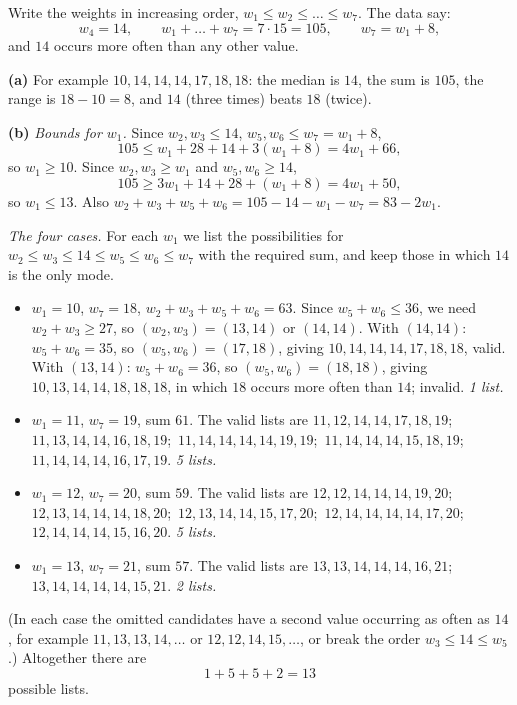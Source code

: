 Write the weights in increasing order, $w_1\le w_2\le\dots\le w_7$. The data say:
\[
w_4=14,\qquad w_1+\dots+w_7=7\cdot15=105,\qquad w_7=w_1+8,
\]
and $14$ occurs more often than any other value.

\textbf{(a)} For example $10,14,14,14,17,18,18$: the median is $14$, the sum is $105$, the range is $18-10=8$, and $14$ (three times) beats $18$ (twice).

\textbf{(b)} \emph{Bounds for $w_1$.} Since $w_2,w_3\le14$, $w_5,w_6\le w_7=w_1+8$,
\[
105\le w_1+28+14+3(w_1+8)=4w_1+66,
\]
so $w_1\ge10$. Since $w_2,w_3\ge w_1$ and $w_5,w_6\ge14$,
\[
105\ge 3w_1+14+28+(w_1+8)=4w_1+50,
\]
so $w_1\le13$. Also $w_2+w_3+w_5+w_6=105-14-w_1-w_7=83-2w_1$.

\emph{The four cases.} For each $w_1$ we list the possibilities for $w_2\le w_3\le14\le w_5\le w_6\le w_7$ with the required sum, and keep those in which $14$ is the only mode.
\begin{itemize}
\item $w_1=10$, $w_7=18$, $w_2+w_3+w_5+w_6=63$. Since $w_5+w_6\le36$, we need $w_2+w_3\ge27$, so $(w_2,w_3)=(13,14)$ or $(14,14)$. With $(14,14)$: $w_5+w_6=35$, so $(w_5,w_6)=(17,18)$, giving $10,14,14,14,17,18,18$, valid. With $(13,14)$: $w_5+w_6=36$, so $(w_5,w_6)=(18,18)$, giving $10,13,14,14,18,18,18$, in which $18$ occurs more often than $14$; invalid. \quad\emph{1 list.}
\item $w_1=11$, $w_7=19$, sum $61$. The valid lists are
$11,12,14,14,17,18,19$;\ $11,13,14,14,16,18,19$;\ $11,14,14,14,14,19,19$;\ $11,14,14,14,15,18,19$;\ $11,14,14,14,16,17,19$. \quad\emph{5 lists.}
\item $w_1=12$, $w_7=20$, sum $59$. The valid lists are
$12,12,14,14,14,19,20$;\ $12,13,14,14,14,18,20$;\ $12,13,14,14,15,17,20$;\ $12,14,14,14,14,17,20$;\ $12,14,14,14,15,16,20$. \quad\emph{5 lists.}
\item $w_1=13$, $w_7=21$, sum $57$. The valid lists are
$13,13,14,14,14,16,21$;\ $13,14,14,14,14,15,21$. \quad\emph{2 lists.}
\end{itemize}
(In each case the omitted candidates have a second value occurring as often as $14$, for example $11,13,13,14,\dots$ or $12,12,14,15,\dots$, or break the order $w_3\le14\le w_5$.) Altogether there are
\[
1+5+5+2=\boxed{13}
\]
possible lists.
